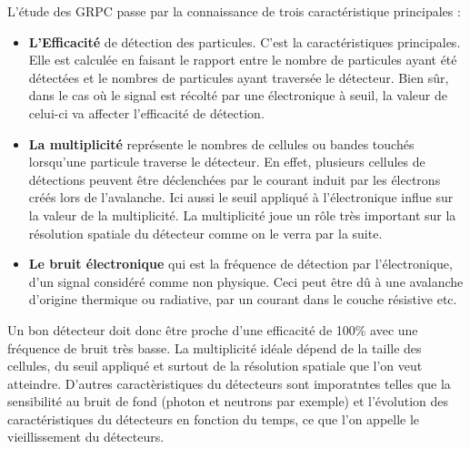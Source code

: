 L'étude des GRPC passe par la connaissance de trois caractéristique principales :
\begin{itemize}[label=$bullet$]
	\item \textbf{L'Efficacité} de détection des particules. C'est la caractéristiques principales. Elle est calculée en faisant le rapport entre le nombre de particules ayant été détectées et le nombres de particules ayant traversée le détecteur. Bien sûr, dans le cas où le signal est récolté par une électronique à seuil, la valeur de celui-ci va affecter l'efficacité de détection.
	\item \textbf{La multiplicité} représente le nombres de cellules ou bandes touchés lorsqu'une particule traverse le détecteur. En effet, plusieurs cellules de détections peuvent être déclenchées par le courant induit par les électrons créés lors de l'avalanche. Ici aussi le seuil appliqué à l'électronique influe sur la valeur de la multiplicité. La multiplicité joue un rôle très important sur la résolution spatiale du détecteur comme on le verra par la suite.
	\item \textbf{Le bruit électronique} qui est la fréquence de détection par l'électronique, d'un signal considéré comme non physique. Ceci peut être dû à une avalanche d'origine thermique ou radiative, par un courant dans le couche résistive etc. 
\end{itemize}

Un bon détecteur doit donc être proche d'une efficacité de 100\% avec une fréquence de bruit très basse. La multiplicité idéale dépend de la taille des cellules, du seuil appliqué et surtout de la résolution spatiale que l'on veut atteindre. D'autres caractèristiques du détecteurs sont imporatntes telles que la sensibilité au bruit de fond (photon et neutrons par exemple) et l'évolution des caractéristiques du détecteurs en fonction du temps, ce que l'on appelle le vieillissement du détecteurs.

